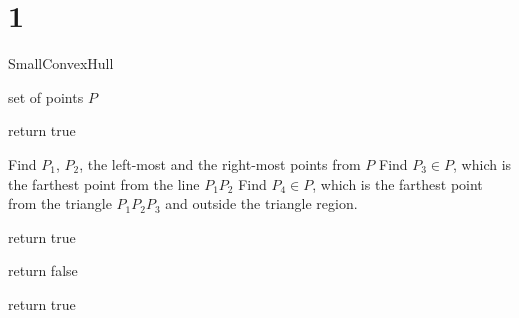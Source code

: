 
\section*{1}

\begin{algorithm}[h]
  \caption{SmallConvexHull}
  \label{alg:smallconvexhull}
  \begin{algorithmic}
      \Require set of points $P$
      
      	\State return true
      \EndIf

     \State Find $P_1$, $P_2$, the left-most and the right-most points from $P$
     \State Find $P_3 \in P$, which is the farthest point from the line $P_1 P_2$     
     \State Find $P_4 \in P$, which is the farthest point from the triangle $P_1 P_2 P_3$ and outside the triangle region.
     
     \State return true
     \EndIf
     
     \State return false
     \EndIf
       
     \State return true

\end{algorithmic}
\end{algorithm}

